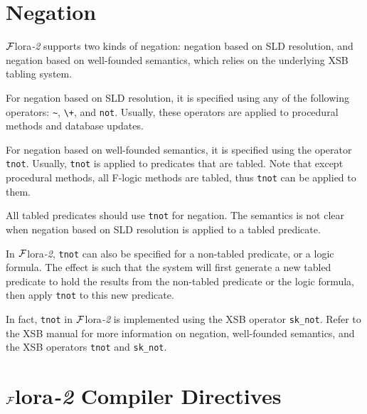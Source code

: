 \documentclass[11pt]{article}
\newcommand{\FLORA}{{\mbox{${\cal F}${\sc lora}\rm\emph{-2}}}\xspace}
\newcommand{\fl}{\mbox{F-logic}\xspace}
\begin{document}
\section{Negation} \label{sec:negation}


\FLORA supports two kinds of negation: negation based on SLD resolution,
and negation based on well-founded semantics, which relies on the
underlying XSB tabling system.

For negation based on SLD resolution, it is specified using any of the
following operators: \verb|~|, \verb|\+|, and {\tt not}. Usually, these
operators are applied to procedural methods and database updates.

For negation based on well-founded semantics, it is specified using the
operator {\tt tnot}. Usually, {\tt tnot} is applied to predicates that
are tabled. Note that except procedural methods, all \fl methods are
tabled, thus {\tt tnot} can be applied to them.

All tabled predicates should use {\tt tnot} for negation. The
semantics is not clear when negation based on SLD resolution is
applied to a tabled predicate.

In \FLORA, {\tt tnot} can also be specified for a non-tabled
predicate, or a logic formula. The effect is such that the system will
first generate a new tabled predicate to hold the results from the
non-tabled predicate or the logic formula, then apply {\tt tnot} to
this new predicate.

In fact, {\tt tnot} in \FLORA is implemented using the XSB operator
\verb|sk_not|. Refer to the XSB manual for more information on
negation, well-founded semantics, and the XSB operators {\tt tnot} and
\verb|sk_not|.


\section{\FLORA Compiler Directives} \label{sec-comp-directives}
\end{document}
